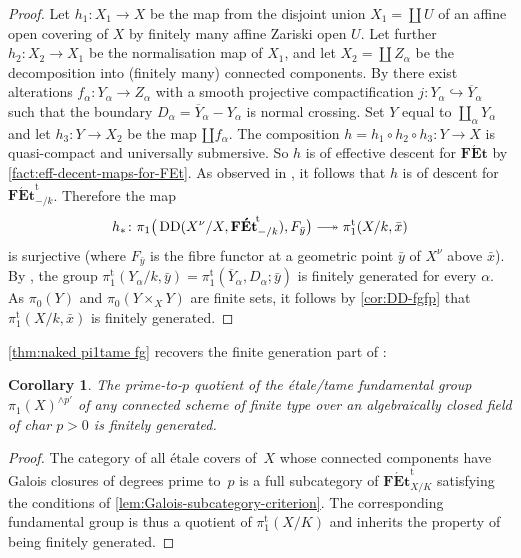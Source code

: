 \documentclass[a4paper,twoside,11pt,reqno]{amsart}
\DeclareRobustCommand\longtwoheadrightarrow {\relbar\joinrel\twoheadrightarrow}
\newcommand{\surj}{\longtwoheadrightarrow}
\newcommand{\inj}{\hookrightarrow}
\newcommand{\cat}[1]{\mathbf{#1}}
\newcommand{\FEt}{\cat{F\acute{E}t}}
\newcommand{\ov}[1]{\overline{#1}}
\newcommand{\pitame}{\pi_1^{\mathrm{t}}}
\newcommand{\FEtt}{{\cat{F\acute{E}t}}^{\!\mathrm{t}}}
\DeclareMathOperator{\Desc}{DD}
\newtheorem{cor}[thm]{Corollary}
\theoremstyle{definition}
\numberwithin{equation}{subsection}
\begin{document}
\begin{proof}
Let $h_1 \colon X_1 \to X$ be the map from the disjoint union $X_1 = \coprod U$ of an affine open covering of $X$ by finitely many affine Zariski open $U$. 
Let further $h_2\colon X_2 \to X_1$ be the normalisation map of $X_1$, and let $X_2 = \coprod Z_\alpha$ be the decomposition into (finitely many) connected components. 
By \cite[Theorem~4.1]{deJong1996:SmoothnessSemistabilityAlterations} there exist  alterations $f_\alpha\colon  Y_\alpha \to Z_\alpha$ with a smooth projective compactification
$j\colon  Y_\alpha \inj \ov{Y}_\alpha$ such that the boundary $D_\alpha = \ov{Y}_\alpha - Y_\alpha$ is normal crossing. 
Set $Y$ equal to $\coprod_\alpha Y_\alpha$ and let $h_3: Y \to X_2$ be the map $\amalg f_\alpha$. 
The composition $h = h_1\circ  h_2 \circ h_3 \colon Y \to X$ is quasi-compact and universally submersive. So $h$ is of effective descent for $\FEt$ by \cref{fact:eff-decent-maps-for-FEt}.
As observed in , it follows that $h$ is of  descent for $\FEtt_{-/k}$.
Therefore the map
\[
h_\ast\colon  \pi_1\big(\Desc(X^\nu/X,\FEtt_{-/k}), F_{\bar y}\big) \surj \pitame(X/k,\bar x)
\]
is surjective (where $F_{\bar y}$ is the fibre functor at a geometric point $\bar y$ of $X^\nu$ above $\bar x$). 
By \cite[Proposition~3.2]{EsnaultShustermanSrinivas2022:FinitePresentationTame}, the group $\pitame(Y_\alpha/k,\bar y) = \pitame(\ov{Y}_\alpha,D_\alpha; \bar y)$ is finitely generated for every $\alpha$.  
As $\pi_0(Y)$ and $\pi_0(Y \times_X Y)$ are finite sets,
it follows by \cref{cor:DD-fgfp} 
that $\pitame(X/k,\bar x)$ is finitely generated. 
\end{proof}

\cref{thm:naked pi1tame fg} recovers the finite generation part of \cite[Th\'eor\`eme~4.11]{Orgogozo2003:AlterationsGroupeFondamental}:

\begin{cor}
    The prime-to-$p$ quotient of the \'etale/tame fundamental group $\pi_1(X)^{\wedge p'}$ of any connected scheme of finite type over an algebraically closed field of char $p>0$ is finitely generated.
\end{cor}

\begin{proof}
    The category of all étale covers of~$X$ whose connected components have Galois closures of degrees prime to~$p$ is a full subcategory of $\FEtt_{X/K}$ satisfying the conditions of \cref{lem:Galois-subcategory-criterion}.
    The corresponding fundamental group is thus a quotient of $\pitame(X/K)$ and inherits the property of being finitely generated.
\end{proof}
\end{document}
